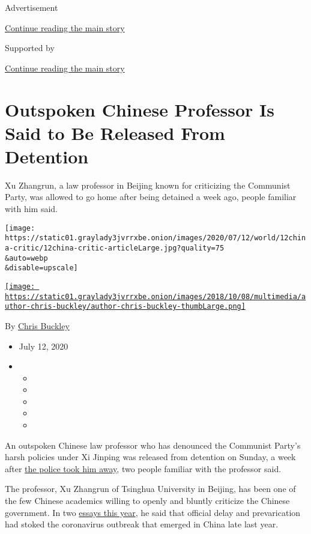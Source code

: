 Advertisement

\protect\hyperlink{after-top}{Continue reading the main story}

Supported by

\protect\hyperlink{after-sponsor}{Continue reading the main story}

\hypertarget{outspoken-chinese-professor-is-said-to-be-released-from-detention}{%
\section{Outspoken Chinese Professor Is Said to Be Released From
Detention}\label{outspoken-chinese-professor-is-said-to-be-released-from-detention}}

Xu Zhangrun, a law professor in Beijing known for criticizing the
Communist Party, was allowed to go home after being detained a week ago,
people familiar with him said.

\texttt{[image: https://static01.graylady3jvrrxbe.onion/images/2020/07/12/world/12china-critic/12china-critic-articleLarge.jpg?quality=75\\\&auto=webp\\\&disable=upscale]}

\href{https://www.nytimes3xbfgragh.onion/by/chris-buckley}{\texttt{[image: https://static01.graylady3jvrrxbe.onion/images/2018/10/08/multimedia/author-chris-buckley/author-chris-buckley-thumbLarge.png]}}

By \href{https://www.nytimes3xbfgragh.onion/by/chris-buckley}{Chris
Buckley}

\begin{itemize}
\item
  July 12, 2020
\item
  \begin{itemize}
  \item
  \item
  \item
  \item
  \item
  \end{itemize}
\end{itemize}

An outspoken Chinese law professor who has denounced the Communist
Party's harsh policies under Xi Jinping was released from detention on
Sunday, a week after
\href{https://www.nytimes3xbfgragh.onion/2020/07/06/world/asia/china-detains-xu-zhangrun-critic.html}{the
police took him away}, two people familiar with the professor said.

The professor, Xu Zhangrun of Tsinghua University in Beijing, has been
one of the few Chinese academics willing to openly and bluntly criticize
the Chinese government. In two
\href{https://www.chinafile.com/reporting-opinion/viewpoint/viral-alarm-when-fury-overcomes-fear}{essays
this year}, he said that official delay and prevarication had stoked the
coronavirus outbreak that emerged in China late last year.

